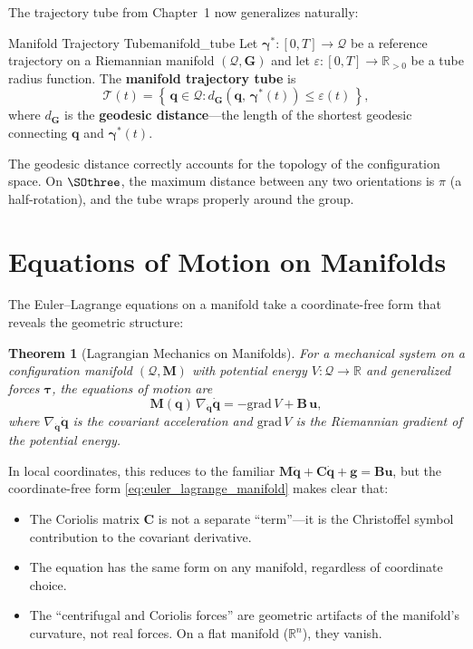 \documentclass[12pt, openany]{book}
\theoremstyle{plain}
\newtheorem{theorem}{Theorem}[chapter]
\newcommand{\control}{\bm{u}}
\newcommand{\traj}{\bm{\gamma}}
\newcommand{\configspace}{\mathcal{Q}}
\newcommand{\Reals}{\mathbb{R}}
\begin{document}
The trajectory tube from Chapter~1 now generalizes naturally:

\begin{definition}{Manifold Trajectory Tube}{manifold_tube}
  Let $\traj^*: [0, T] \to \configspace$ be a reference trajectory on a
  Riemannian manifold $(\configspace, \bm{G})$ and let
  $\varepsilon: [0, T] \to \Reals_{>0}$ be a tube radius function. The
  \textbf{manifold trajectory tube} is
  \begin{equation}
    \mathcal{T}(t) = \left\{\, \bm{q} \in \configspace :
    d_{\bm{G}}\!\left(\bm{q},\, \traj^*(t)\right) \leq \varepsilon(t) \,\right\},
  \end{equation}
  where $d_{\bm{G}}$ is the \textbf{geodesic distance}---the length of the
  shortest geodesic connecting $\bm{q}$ and $\traj^*(t)$.
\end{definition}

The geodesic distance correctly accounts for the topology of the configuration
space. On $\SOthree$, the maximum distance between any two orientations is $\pi$
(a half-rotation), and the tube wraps properly around the group.

\section{Equations of Motion on Manifolds}

The Euler--Lagrange equations on a manifold take a coordinate-free form that
reveals the geometric structure:

\begin{theorem}[Lagrangian Mechanics on Manifolds]\label{thm:lagrange_manifold}
  For a mechanical system on a configuration manifold $(\configspace, \bm{M})$
  with potential energy $V: \configspace \to \Reals$ and generalized forces
  $\bm{\tau}$, the equations of motion are
  \begin{equation}\label{eq:euler_lagrange_manifold}
    \bm{M}(\bm{q})\, \nabla_{\dot{\bm{q}}} \dot{\bm{q}} = -\mathrm{grad}\, V + \bm{B}\, \control,
  \end{equation}
  where $\nabla_{\dot{\bm{q}}} \dot{\bm{q}}$ is the covariant acceleration and
  $\mathrm{grad}\, V$ is the Riemannian gradient of the potential energy.
\end{theorem}

In local coordinates, this reduces to the familiar
$\bm{M}\ddot{\bm{q}} + \bm{C}\dot{\bm{q}} + \bm{g} = \bm{B}\control$,
but the coordinate-free form \eqref{eq:euler_lagrange_manifold} makes clear that:
\begin{itemize}[leftmargin=1.5cm]
  \item The Coriolis matrix $\bm{C}$ is not a separate ``term''---it is the
    Christoffel symbol contribution to the covariant derivative.
  \item The equation has the same form on any manifold, regardless of coordinate
    choice.
  \item The ``centrifugal and Coriolis forces'' are geometric artifacts of the
    manifold's curvature, not real forces. On a flat manifold ($\Reals^n$),
    they vanish.
\end{itemize}
\end{document}
